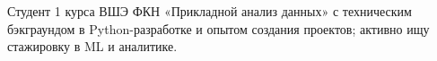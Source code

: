 

\begin{cvparagraph}

Студент 1 курса ВШЭ ФКН «Прикладной анализ данных» с техническим бэкграундом в Python-разработке и опытом создания проектов; активно ищу стажировку в ML и аналитике.
\end{cvparagraph}

